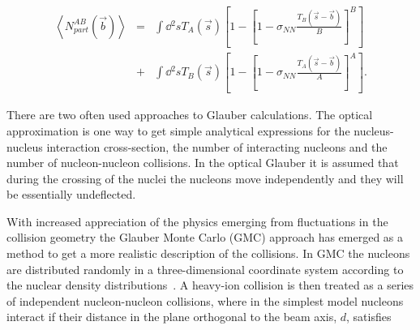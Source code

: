 \begin{eqnarray}
\left<N_{part}^{AB}\left(\vec b\right)\right>&=&\int \dd{^2s} T_A\left(\vec s\right)\left[1-\left[1-\sigma_{NN}\frac{T_B\left(\vec s - \vec b\right)}{B}\right]^B\right] \nonumber \\
 &+ &\int \dd{^2 s} T_B\left(\vec s\right)\left[1-\left[1-\sigma_{NN}\frac{T_A\left(\vec s - \vec b\right)}{A}\right]^A\right].
\end{eqnarray}

%
%
%
%
%
%
%
%
%
%
%


%




There are two often used approaches to Glauber calculations. The optical approximation is one way to get simple analytical expressions for the nucleus-nucleus interaction cross-section, the number of interacting  nucleons and the number of nucleon-nucleon collisions. In the optical Glauber it is assumed that during the crossing of the nuclei the nucleons move independently and they will be essentially undeflected.  

With increased appreciation of the physics emerging from fluctuations in the collision geometry the Glauber Monte Carlo (GMC) approach has emerged as a method to get a more realistic description of the collisions. In GMC the nucleons are distributed randomly in a three-dimensional coordinate system according to the nuclear density distributions~\cite{Abelev:2013qoq}. A heavy-ion collision is then treated as a series of independent nucleon-nucleon collisions, where in the simplest model nucleons interact if their distance  in the plane orthogonal to the beam axis, $d$, satisfies

